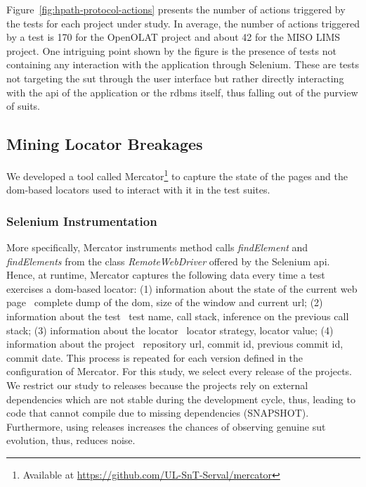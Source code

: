 Figure~\ref{fig:hpath-protocol-actions} presents the number of actions triggered by the tests for each project under study. In average, the number of actions triggered by a test is 170 for the OpenOLAT project and about 42 for the MISO LIMS project. One intriguing point shown by the figure is the presence of tests not containing any interaction with the application through Selenium. These are tests not targeting the \gls{sut} through the user interface but rather directly interacting with the \gls{api} of the application or the \gls{rdbms} itself, thus falling out of the purview of \gls{suit}s.

\subsection{Mining Locator Breakages}
\label{sec:hpath-protocol-elements}

We developed a tool called Mercator\footnote{Available at \url{https://github.com/UL-SnT-Serval/mercator}} to capture the state of the pages and the \gls{dom}-based locators used to interact with it in the test suites. 

\subsubsection{Selenium Instrumentation}
\label{sec:hpath-protocol-instrumention}

More specifically, Mercator instruments method calls \emph{findElement} and \emph{findElements} from the class \emph{RemoteWebDriver} offered by the Selenium \gls{api}. Hence, at runtime, Mercator captures the following data every time a test exercises a \gls{dom}-based locator: (1) information about the state of the current web page \ie\ complete dump of the \gls{dom}, size of the window and current \gls{url}; (2) information about the test \ie\ test name, call stack, inference on the previous call stack; (3) information about the locator \ie\ locator strategy, locator value; (4) information about the project \ie\ repository \gls{url}, commit id, previous commit id, commit date. This process is repeated for each version defined in the configuration of Mercator. For this study, we select every release of the projects. We restrict our study to releases because the projects rely on external dependencies which are not stable during the development cycle, thus, leading to code that cannot compile due to missing dependencies (SNAPSHOT). Furthermore, using releases increases the chances of observing genuine \gls{sut} evolution, thus, reduces noise.

